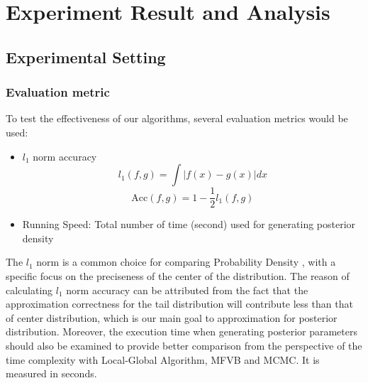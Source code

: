\chapter{Experiment Result and Analysis}
\label{Chapter4}
\section{Experimental Setting}
\subsection{Evaluation metric}
To test the effectiveness of our algorithms, several evaluation metrics would be used:

\begin{itemize}
	\item $l_1$ norm accuracy 
    \begin{equation}
		l_1(f,g) = \int |f(x)-g(x)|dx
	\end{equation}
	\begin{equation}
		\text{Acc}(f,g) = 1 - \frac{1}{2}l_1(f,g) 
	\end{equation}
    \item Running Speed: Total number of time (second) used for generating posterior density
	
\end{itemize}
The $l_1$ norm is a common choice for comparing Probability Density , with a specific focus on the preciseness of the center of the distribution. The reason of calculating $l_1$ norm accuracy can be attributed from the fact that the approximation correctness for the tail distribution will contribute less than that of center distribution, which is our main goal to approximation for posterior distribution.
Moreover, the execution time when generating posterior parameters should also be examined to provide better comparison from the perspective of the time complexity with Local-Global Algorithm, MFVB and MCMC. It is measured in seconds.

%

